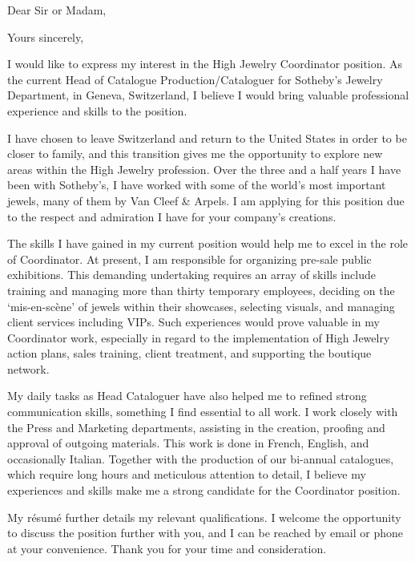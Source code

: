 

\date{June 28, 2014}
\opening{Dear Sir or Madam,}
\closing{Yours sincerely,}
\makelettertitle


I would like to express my interest in the High Jewelry Coordinator position.  As the current Head of Catalogue Production/Cataloguer for Sotheby’s Jewelry Department, in Geneva, Switzerland, I believe I would bring valuable professional experience and skills to the position.


I have chosen to leave Switzerland and return to the United States in order to be closer to family, and this transition gives me the opportunity to explore new areas within the High Jewelry profession. Over the three and a half years I have been with Sotheby’s, I have worked with some of the world's most important jewels, many of them by Van Cleef \& Arpels. I am applying for this position due to the respect and admiration I have for your company's creations.


The skills I have gained in my current position would help me to excel in the role of Coordinator.  At present, I am responsible for organizing pre-sale public exhibitions. This demanding undertaking requires an array of skills include training and managing more than thirty temporary employees, deciding on the ‘mis-en-sc\`{e}ne’ of jewels within their showcases, selecting visuals, and managing client services including VIPs. Such experiences would prove valuable in my Coordinator work, especially in regard to the implementation of High Jewelry action plans, sales training, client treatment, and supporting the boutique network.


My daily tasks as Head Cataloguer have also helped me to refined strong communication skills, something I find essential to all work. I  work closely with the Press and Marketing departments, assisting in the creation, proofing and approval of outgoing materials. This work is done in French, English, and occasionally Italian. Together with the production of our bi-annual catalogues, which require long hours and meticulous attention to detail, I believe my experiences and skills make me a strong candidate for the Coordinator position.


My r\'{e}sum\'{e} further details my relevant qualifications. I welcome the opportunity to discuss the position further with you, and I can be reached by email or phone at your convenience. Thank you for your time and consideration.


\makeletterclosing


